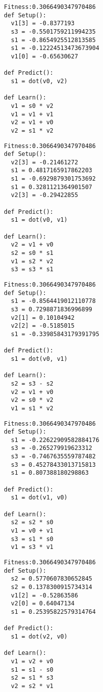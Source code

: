 \documentclass[twocolumn, a4j]{jarticle}
\begin{document}
\newpage

\begin{lstlisting}[caption= No. 0.11]
Fitness:0.3066490347970486 
def Setup():
  v1[3] = -0.8377193
  s3 = -0.5501759211994235
  s1 = -0.8654925512813585
  s1 = -0.12224513473673904
  v1[0] = -0.65630627

def Predict():
  s1 = dot(v0, v2)

def Learn():
  v1 = s0 * v2
  v1 = v1 + v1
  v2 = v1 + v0
  v2 = s1 * v2

\end{lstlisting}

\begin{lstlisting}[caption= No. 0.12]
Fitness:0.3066490347970486 
def Setup():
  v2[3] = -0.21461272
  s1 = 0.4817165917862203
  s1 = -0.6929879301753692
  s1 = 0.3281121364901507
  v2[3] = -0.29422855

def Predict():
  s1 = dot(v0, v1)

def Learn():
  v2 = v1 + v0
  s2 = s0 * s1
  v1 = s2 * v2
  s3 = s3 * s1

\end{lstlisting}

\newpage

\begin{lstlisting}[caption= No. 0.13]
Fitness:0.3066490347970486 
def Setup():
  s1 = -0.8564419012110778
  s3 = 0.7298871836996899
  v2[1] = 0.10104942
  v2[2] = -0.5185015
  s1 = -0.33985843179391795

def Predict():
  s1 = dot(v0, v1)

def Learn():
  s2 = s3 - s2
  v2 = v1 + v0
  v2 = s0 * v2
  v1 = s1 * v2

\end{lstlisting}

\begin{lstlisting}[caption= No. 0.14]
Fitness:0.3066490347970486 
def Setup():
  s1 = -0.22622909582884176
  s3 = -0.265279919623312
  s3 = -0.7467635559787482
  s3 = 0.45278433013715813
  s1 = 0.807388180298863

def Predict():
  s1 = dot(v1, v0)

def Learn():
  s2 = s2 * s0
  v1 = v0 + v1
  s3 = s1 * s0
  v1 = s3 * v1

\end{lstlisting}

\newpage

\begin{lstlisting}[caption= No. 0.15]
Fitness:0.3066490347970486 
def Setup():
  s2 = 0.5770607830652845
  s2 = 0.1378300915734314
  v1[2] = -0.52863586
  v2[0] = 0.64047134
  s1 = 0.25395822579314764

def Predict():
  s1 = dot(v2, v0)

def Learn():
  v1 = v2 + v0
  s1 = s1 - s0
  s2 = s1 * s3
  v2 = s2 * v1

\end{lstlisting}
\end{document}
